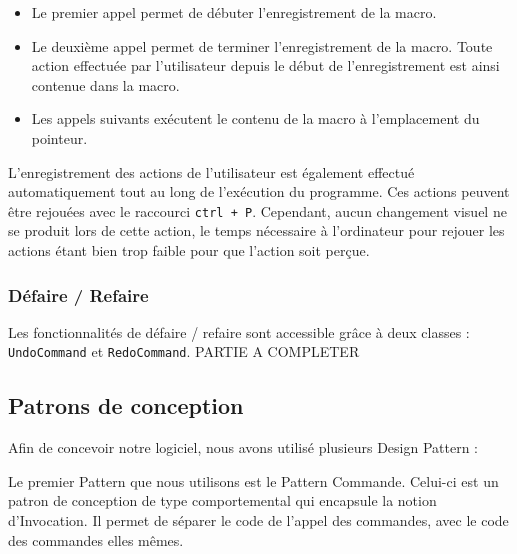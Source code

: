 \documentclass[a4paper]{article}
\begin{document}
			\begin{itemize}
				\item Le premier appel permet de débuter l’enregistrement de la macro.

				\item Le deuxième appel permet de terminer l’enregistrement de la macro. Toute action effectuée par l’utilisateur depuis le début de l’enregistrement est ainsi contenue dans la macro.

				\item Les appels suivants exécutent le contenu de la macro à l’emplacement du pointeur.
			\end{itemize}

			L’enregistrement des actions de l’utilisateur est également effectué automatiquement tout au long de l’exécution du programme. Ces actions peuvent être rejouées avec le raccourci \texttt{ctrl + P}. Cependant, aucun changement visuel ne se produit lors de cette action, le temps nécessaire à l’ordinateur pour rejouer les actions étant bien trop faible pour que l’action soit perçue.

			\subsubsection{Défaire / Refaire}

			Les fonctionnalités de défaire / refaire sont accessible grâce à deux classes : \texttt{UndoCommand} et \texttt{RedoCommand}.
PARTIE A COMPLETER

		\vspace{0.5cm}

		\subsection{Patrons de conception}

		\vspace{0.5cm}

		Afin de concevoir notre logiciel, nous avons utilisé plusieurs Design Pattern :

		\vspace{0.5cm}

		Le premier Pattern que nous utilisons est le Pattern Commande. Celui-ci est un patron de conception de type comportemental qui encapsule la notion d'Invocation. Il permet de séparer le code de l'appel des commandes, avec le code des commandes elles mêmes.
\end{document}
